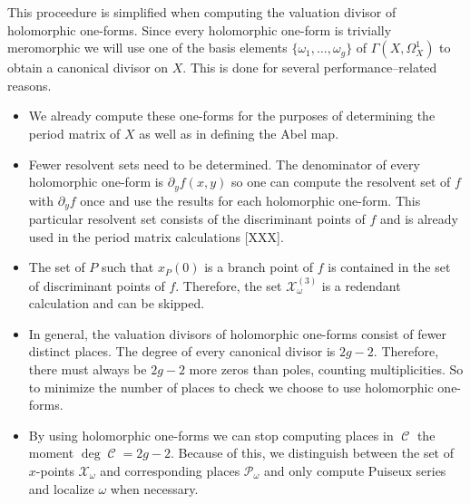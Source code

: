 \documentclass[12pt]{article}
\theoremstyle{definition}
\DeclareMathOperator{\DivC}{\mathcal{C}}
\begin{document}
This proceedure is simplified when computing the valuation divisor of
holomorphic one-forms. Since every holomorphic one-form is trivially
meromorphic we will use one of the basis elements $\{\omega_1, \ldots,
\omega_g\}$ of $\Gamma(X,\Omega_X^1)$ to obtain a canonical divisor on
$X$. This is done for several performance--related reasons.
\begin{itemize}
\item We already compute these one-forms for the purposes of determining
  the period matrix of $X$ as well as in defining the Abel map.
\item Fewer resolvent sets need to be determined. The denominator of
  every holomorphic one-form is $\partial_y f(x,y)$ so one can compute
  the resolvent set of $f$ with $\partial_y f$ once and use the results
  for each holomorphic one-form. This particular resolvent set consists
  of the discriminant points of $f$ and is already used in the period
  matrix calculations [XXX].
\item The set of $P$ such that $x_P(0)$ is a branch point of $f$ is
  contained in the set of discriminant points of $f$. Therefore, the set
  $\mathcal{X}_\omega^{(3)}$ is a redendant calculation and can be
  skipped.
\item In general, the valuation divisors of holomorphic one-forms
  consist of fewer distinct places. The degree of every canonical
  divisor is $2g-2$. Therefore, there must always be $2g-2$ more zeros
  than poles, counting multiplicities. So to minimize the number of
  places to check we choose to use holomorphic one-forms.
\item By using holomorphic one-forms we can stop computing places in
  $\DivC$ the moment $\deg \DivC = 2g-2$. Because of this, we
  distinguish between the set of $x$-points $\mathcal{X}_\omega$ and
  corresponding places $\mathcal{P}_\omega$ and only compute Puiseux
  series and localize $\omega$ when necessary.
\end{itemize}
\end{document}
